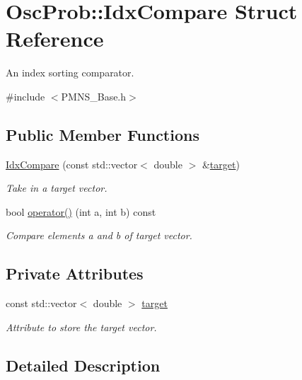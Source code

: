 \hypertarget{structOscProb_1_1IdxCompare}{}\section{Osc\+Prob\+:\+:Idx\+Compare Struct Reference}
\label{structOscProb_1_1IdxCompare}


An index sorting comparator.  




{\ttfamily \#include $<$P\+M\+N\+S\+\_\+\+Base.\+h$>$}

\subsection*{Public Member Functions}
\begin{DoxyCompactItemize}
\item 
\hyperlink{structOscProb_1_1IdxCompare_af1c43639da52d0c66e587c7432582cb5}{Idx\+Compare} (const std\+::vector$<$ double $>$ \&\hyperlink{structOscProb_1_1IdxCompare_ab3258085f0afeb64bf472413bfed43ac}{target})
\begin{DoxyCompactList}\small\item\em Take in a target vector. \end{DoxyCompactList}\item 
bool \hyperlink{structOscProb_1_1IdxCompare_ac4c6fc547109b3e0007d6342eea57dff}{operator()} (int a, int b) const
\begin{DoxyCompactList}\small\item\em Compare elements a and b of target vector. \end{DoxyCompactList}\end{DoxyCompactItemize}
\subsection*{Private Attributes}
\begin{DoxyCompactItemize}
\item 
const std\+::vector$<$ double $>$ \hyperlink{structOscProb_1_1IdxCompare_ab3258085f0afeb64bf472413bfed43ac}{target}
\begin{DoxyCompactList}\small\item\em Attribute to store the target vector. \end{DoxyCompactList}\end{DoxyCompactItemize}


\subsection{Detailed Description}


